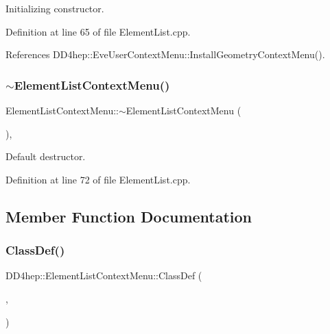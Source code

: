 Initializing constructor. 



Definition at line 65 of file Element\+List.\+cpp.



References D\+D4hep\+::\+Eve\+User\+Context\+Menu\+::\+Install\+Geometry\+Context\+Menu().

\hypertarget{class_d_d4hep_1_1_element_list_context_menu_afb7e217c0f5eeeb14ab40b6e375bae39}{}\label{class_d_d4hep_1_1_element_list_context_menu_afb7e217c0f5eeeb14ab40b6e375bae39} 
\subsubsection{\texorpdfstring{$\sim$\+Element\+List\+Context\+Menu()}{~ElementListContextMenu()}}
{\footnotesize\ttfamily Element\+List\+Context\+Menu\+::$\sim$\+Element\+List\+Context\+Menu (\begin{DoxyParamCaption}{ }\end{DoxyParamCaption})\hspace{0.3cm}{\ttfamily [protected]}, {\ttfamily [virtual]}}



Default destructor. 



Definition at line 72 of file Element\+List.\+cpp.



\subsection{Member Function Documentation}
\hypertarget{class_d_d4hep_1_1_element_list_context_menu_ab60b3abac1f709147788e8de09e8aebb}{}\label{class_d_d4hep_1_1_element_list_context_menu_ab60b3abac1f709147788e8de09e8aebb} 
\subsubsection{\texorpdfstring{Class\+Def()}{ClassDef()}}
{\footnotesize\ttfamily D\+D4hep\+::\+Element\+List\+Context\+Menu\+::\+Class\+Def (\begin{DoxyParamCaption}\item[{\hyperlink{class_d_d4hep_1_1_element_list_context_menu}{Element\+List\+Context\+Menu}}]{,  }\item[{0}]{ }\end{DoxyParamCaption})}



